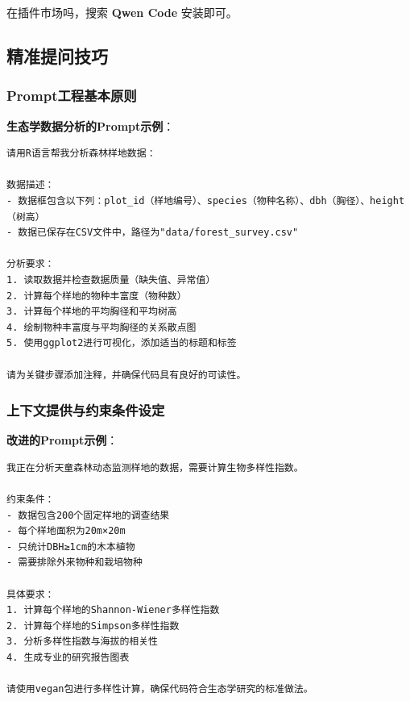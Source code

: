 \documentclass[
]{book}
\begin{document}
在插件市场吗，搜索 \textbf{Qwen Code} 安装即可。

\hypertarget{ux7cbeux51c6ux63d0ux95eeux6280ux5de7}{%
\subsection{精准提问技巧}\label{ux7cbeux51c6ux63d0ux95eeux6280ux5de7}}

\hypertarget{promptux5de5ux7a0bux57faux672cux539fux5219}{%
\subsubsection{Prompt工程基本原则}\label{promptux5de5ux7a0bux57faux672cux539fux5219}}

\textbf{生态学数据分析的Prompt示例}：

\begin{verbatim}
请用R语言帮我分析森林样地数据：

数据描述：
- 数据框包含以下列：plot_id（样地编号）、species（物种名称）、dbh（胸径）、height（树高）
- 数据已保存在CSV文件中，路径为"data/forest_survey.csv"

分析要求：
1. 读取数据并检查数据质量（缺失值、异常值）
2. 计算每个样地的物种丰富度（物种数）
3. 计算每个样地的平均胸径和平均树高
4. 绘制物种丰富度与平均胸径的关系散点图
5. 使用ggplot2进行可视化，添加适当的标题和标签

请为关键步骤添加注释，并确保代码具有良好的可读性。
\end{verbatim}

\hypertarget{ux4e0aux4e0bux6587ux63d0ux4f9bux4e0eux7ea6ux675fux6761ux4ef6ux8bbeux5b9a}{%
\subsubsection{上下文提供与约束条件设定}\label{ux4e0aux4e0bux6587ux63d0ux4f9bux4e0eux7ea6ux675fux6761ux4ef6ux8bbeux5b9a}}

\textbf{改进的Prompt示例}：

\begin{verbatim}
我正在分析天童森林动态监测样地的数据，需要计算生物多样性指数。

约束条件：
- 数据包含200个固定样地的调查结果
- 每个样地面积为20m×20m
- 只统计DBH≥1cm的木本植物
- 需要排除外来物种和栽培物种

具体要求：
1. 计算每个样地的Shannon-Wiener多样性指数
2. 计算每个样地的Simpson多样性指数
3. 分析多样性指数与海拔的相关性
4. 生成专业的研究报告图表

请使用vegan包进行多样性计算，确保代码符合生态学研究的标准做法。
\end{verbatim}
\end{document}
